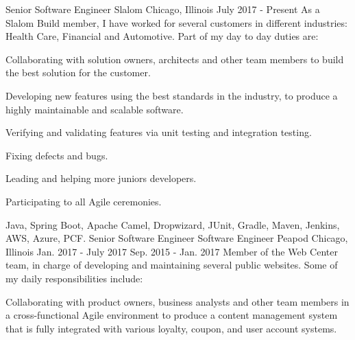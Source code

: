 
\begin{cventries}

  \cventryfive
    {Senior Software Engineer} %
    {Slalom} %
    {Chicago, Illinois} %
    {July 2017 - Present} %
    {As a Slalom Build member, I have worked for several customers in different industries: Health Care, Financial and Automotive. Part of my day to day duties are:}
    {
      \begin{cvitems} %
      	\item {Collaborating with solution owners, architects and other team members to build the best solution for the customer.}
      	\item {Developing new features using the best standards in the industry, to produce a highly maintainable and scalable software.}
      	\item {Verifying and validating features via unit testing and integration testing.}
      	\item {Fixing defects and bugs.}
      	\item {Leading and helping more juniors developers.}
        \item {Participating to all Agile ceremonies.}
      \end{cvitems}
    }
    {Java, Spring Boot, Apache Camel, Dropwizard, JUnit, Gradle, Maven, Jenkins, AWS, Azure, PCF.}
  \cventryfour
    {Senior Software Engineer} %
    {Software Engineer} %
    {Peapod} %
    {Chicago, Illinois} %
    {Jan. 2017 - July 2017} %
    {Sep. 2015 - Jan. 2017} %
    {Member of the Web Center team, in charge of developing and maintaining several public websites. Some of my daily responsibilities include:} %
    {
    \begin{cvitems}
  \item Collaborating with product owners, business analysts and other team members in a cross-functional Agile environment to produce a content management system that is fully integrated with various loyalty, coupon, and user account systems.

\end{cvitems}}
\end{cventries}
